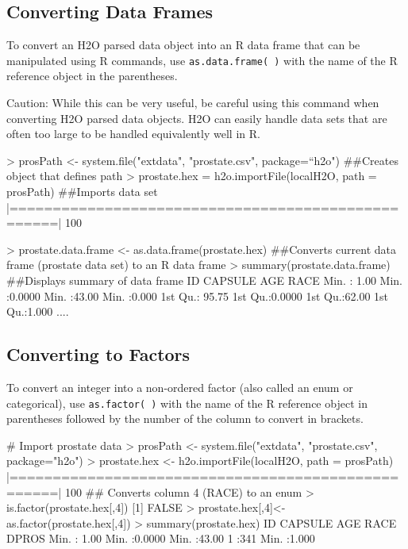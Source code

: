 \documentclass[11pt]{article}
\begin{document}
\subsection{Converting Data Frames}

To convert an H2O parsed data object into an R data frame that can be manipulated using R commands, use {\texttt{as.data.frame( )}} with the name of the R reference object in the parentheses.

Caution: While this can be very useful, be careful using this command when converting H2O parsed data objects. H2O can easily handle data sets that are often too large to be handled equivalently well in R. 

\begin{spverbatim}
> prosPath <- system.file("extdata", "prostate.csv", package=“h2o")
##Creates object that defines path
 > prostate.hex = h2o.importFile(localH2O, path = prosPath)
##Imports data set
  |===================================================| 100%

 > prostate.data.frame <- as.data.frame(prostate.hex)
##Converts current data frame (prostate data set) to an R data frame
 > summary(prostate.data.frame) ##Displays summary of data frame
       ID            CAPSULE            AGE             RACE
Min.   :  1.00   Min.   :0.0000   Min.   :43.00   Min.   :0.000
1st Qu.: 95.75   1st Qu.:0.0000   1st Qu.:62.00   1st Qu.:1.000
       .... 
\end{spverbatim}


\subsection{Converting to Factors}

To convert an integer into a non-ordered factor (also called an enum or categorical), use {\texttt{as.factor( )}} with the name of the R reference object in parentheses followed by the number of the column to convert in brackets. 
\begin{spverbatim}
# Import prostate data
> prosPath <- system.file("extdata", "prostate.csv", package="h2o")
> prostate.hex <- h2o.importFile(localH2O, path = prosPath)
|===================================================| 100%
## Converts column 4 (RACE) to an enum
> is.factor(prostate.hex[,4])
[1] FALSE
> prostate.hex[,4]<-as.factor(prostate.hex[,4]) 
> summary(prostate.hex)
 ID               CAPSULE          AGE             RACE    DPROS
 Min.   :  1.00   Min.   :0.0000   Min.   :43.00   1 :341  Min.   :1.000
\end{spverbatim}
\end{document}
